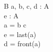 \begin{zed}
[A]
\end{zed}

\begin{schema}{B}
  a, b, c, d : \seq A \\
  e : A \\
\where
  a = b \cat c \\
  e = last(a) \\
  d = front(a) \\
\end{schema}